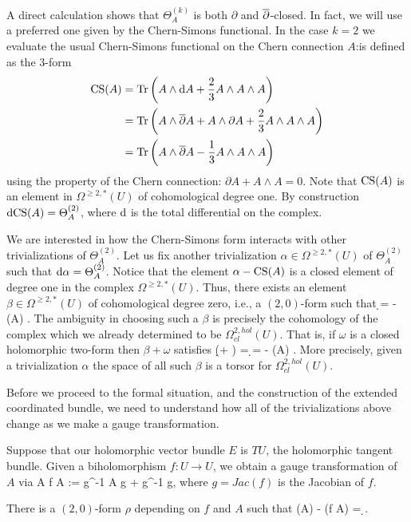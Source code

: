 A direct calculation shows that $\Theta^{(k)}_A$ is both $\partial$ and
$\overline{\partial}$-closed. In fact, we will use a
preferred one given by the Chern-Simons functional. 
In the case $k = 2$ we evaluate the usual Chern-Simons functional on the Chern connection $A$:is defined as the $3$-form
\begin{align*}
{\rm CS} (A) & = {\rm Tr}\left(A \wedge {\rm d} A + \frac{2}{3} A \wedge A \wedge A \right) \\ & = {\rm Tr}\left(A \wedge \overline{\partial} A + A \wedge \partial A + \frac{2}{3} A \wedge A \wedge A \right) \\
& = {\rm Tr}\left(A \wedge \overline{\partial} A - \frac{1}{3} A\wedge A \wedge A\right)
\end{align*}
using the property of the Chern connection: $\partial A + A \wedge A = 0$. 
Note that ${\rm CS} (A)$ is an element in $\Omega^{\geq 2, *} (U)$ of cohomological degree one. 
By construction ${\rm d}{\rm CS}(A) =\Theta^{(2)}_A$, 
where ${\rm d}$ is the total differential on the complex. 

We are interested in how the Chern-Simons form interacts with other trivializations of $\Theta^{(2)}_A$. 
Let us fix another trivialization $\alpha \in \Omega^{\geq 2, *} (U)$ of $\Theta^{(2)}_A$ 
such that ${\rm d} \alpha = \Theta^{(2)}_A$. 
Notice that the element $\alpha - {\rm CS}(A)$ is a closed element of degree one in the complex $\Omega^{\geq 2, *} (U)$. 
Thus, there exists an element $\beta \in \Omega^{\geq 2, *} (U)$ of cohomological degree zero, i.e., a $(2,0)$-form
such that
\ben
\d \beta = \alpha - \CS (A) .
\een
The ambiguity in choosing such a $\beta$ is precisely the cohomology
of the complex which we already determined to be
$\Omega^{2,hol}_{cl}(U)$. That is, if $\omega$ is a closed holomorphic
two-form then $\beta + \omega$ satisfies 
\ben
\d (\beta + \omega) = \d \beta = \alpha - \CS (A) .
\een
More precisely, given a trivialization $\alpha$ the space of all such $\beta$ is a torsor for
$\Omega^{2,hol}_{cl}(U)$. 

Before we proceed to the formal situation, and the construction of the extended coordinated bundle, 
we need to understand how all of the trivializations above change as we make a gauge transformation. 

Suppose that our holomorphic vector bundle $E$ is $TU$, the holomorphic tangent bundle. 
Given a biholomorphism $f : U \to U$, we obtain a gauge transformation of $A$ via
\ben
A \mapsto f \cdot A := g^{-1} A g + g^{-1} \partial g,
\een
where $g = Jac(f)$ is the Jacobian of $f$. 

\begin{lemma}\label{cs formula} 
There is a $(2,0)$-form $\rho$ depending on $f$ and $A$ such that
\ben
\CS(A) - \CS(f \cdot A) = \d \rho.
\een 
\end{lemma}

